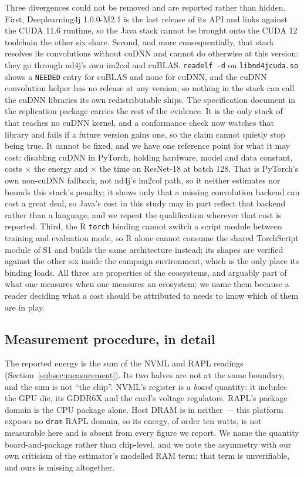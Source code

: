 Three divergences could not be removed and are
reported rather than hidden. First, Deeplearning4j 1.0.0-M2.1 is the last
release of its API and links against the CUDA 11.6 runtime, so the Java stack
cannot be brought onto the CUDA 12 toolchain the other six share. Second, and
more consequentially, that stack resolves its convolutions without cuDNN and
cannot do otherwise at this version: they go through nd4j's own im2col and
cuBLAS. \texttt{readelf -d} on \texttt{libnd4jcuda.so} shows a \texttt{NEEDED}
entry for cuBLAS and none for cuDNN, and the cuDNN convolution helper has no
release at any version, so nothing in the stack can call the cuDNN libraries its
own redistributable ships. The specification document in the replication
package carries the rest of the evidence. It is the only stack of \vEcosystems{} that
reaches no cuDNN kernel, and a conformance check now watches that library and
fails if a future version gains one, so the claim cannot quietly stop being true.
It cannot be fixed, and we have one reference point for what it may cost:
disabling cuDNN in PyTorch, holding hardware, model and data constant, costs
\vCudnnOffEnergyRatio$\times$ the energy and \vCudnnOffTimeRatio$\times$ the
time on ResNet-18 at batch 128. That is PyTorch's own non-cuDNN fallback, not
nd4j's im2col path, so it neither estimates nor bounds this stack's penalty; it
shows only that a missing convolution backend can cost a great deal, so Java's
cost in this study may in part reflect that backend rather than a language, and
we repeat the qualification wherever that cost is reported.
Third, the R \texttt{torch} binding cannot switch a script module between
training and evaluation mode, so R alone cannot consume the shared TorchScript
module of S1 and builds the same architecture instead; its shapes are verified
against the other six inside the campaign environment, which is the only place
its binding loads. All three are properties of the ecosystems, and arguably part
of what one measures when one measures an ecosystem; we name them because a
reader deciding what a cost should be attributed to needs to know which of them
are in play.

\subsection{Measurement procedure, in detail}
\label{app:measurement}

The reported energy is the sum of the NVML and RAPL readings
(Section~\ref{subsec:measurement}). Its two halves are not at the same boundary,
and the sum is not ``the chip''. NVML's register is a \emph{board} quantity: it includes the GPU
die, its GDDR6X and the card's voltage regulators. RAPL's package domain is the
CPU package alone. Host DRAM is in neither --- this platform exposes no
\texttt{dram} RAPL domain, so its energy, of order ten watts, is not measurable
here and is absent from every figure we report. We name the quantity
board-and-package rather than chip-level, and we note the asymmetry with our
own criticism of the estimator's modelled RAM term: that term is unverifiable,
and ours is missing altogether.

